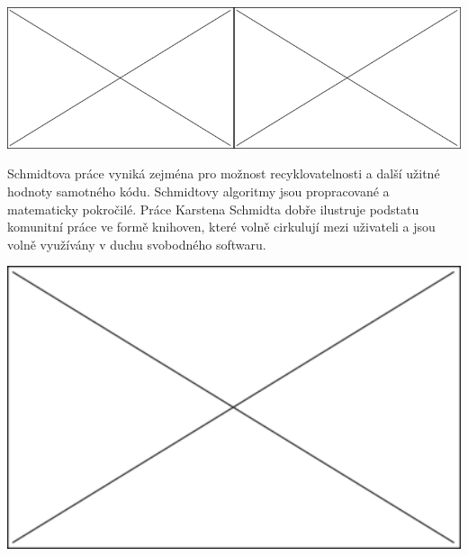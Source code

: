 \documentclass[10pt]{book}
\begin{document}
\begin{center}
\includegraphics[width = 0.5\textwidth]{imgs/neznamy.png}\includegraphics[width = 0.5\textwidth]{imgs/neznamy.png}


\end{center}

Schmidtova práce vyniká zejména pro možnost recyklovatelnosti a další užitné hodnoty samotného kódu. Schmidtovy algoritmy jsou propracované a matematicky pokročilé. Práce Karstena Schmidta dobře ilustruje podstatu komunitní práce ve formě knihoven, které volně cirkulují mezi uživateli a jsou volně využívány v duchu svobodného softwaru. 






\begin{center}
\includegraphics[width = 1\textwidth]{imgs/neznamy.png}

\end{center}
\end{document}
